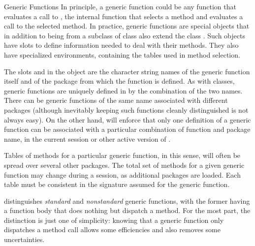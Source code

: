 \begin{Section}{Generic Functions}
In principle, a generic function could be any function that evaluates
a call to , the internal function that selects
a method and evaluates a call to  the selected method.  In practice,
generic functions are special objects that in addition to being from a
subclass of class  also extend the class
.  Such objects have slots to define
information needed to deal with their methods.  They also have
specialized environments, containing the tables used in method
selection.

The slots  and   in the object are the
character string names of the generic function itself and of the
package from which the  function is defined.
As with classes, generic functions are uniquely defined in \R{} by the
combination of the two names.
There can be generic functions of the same name associated with
different packages (although inevitably keeping such functions cleanly
distinguished is not always easy).
On the other hand, \R{} will enforce that only one definition of a
generic function can be associated with a particular combination of
function and package name, in the current session or other active
version of \R{}.

Tables of methods for a particular generic function, in this sense,
will often be spread over several other packages.
The total set of methods for a given generic function may change
during a session, as additional packages are loaded.
Each table must be consistent in the signature assumed for the generic
function.

\R{} distinguishes \emph{standard} and \emph{nonstandard} generic
functions, with the former having a function body that does nothing
but dispatch a method.
For the most part, the distinction is just one of simplicity:  knowing
that a generic function only dispatches a method call allows some
efficiencies and also removes some uncertainties.


\end{Section}
